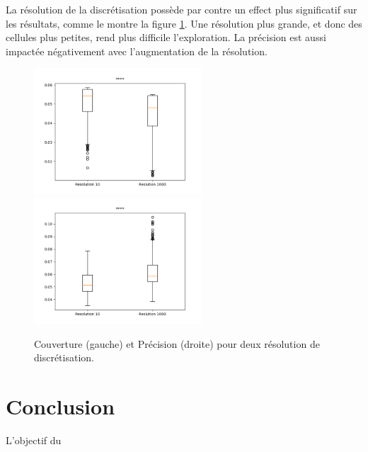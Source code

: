 \documentclass[11pt,french]{report}
\begin{document}
La résolution de la discrétisation possède par contre un effect plus significatif sur les résultats, comme le montre la figure \ref{fig:effet_res}.
Une résolution plus grande, et donc des cellules plus petites, rend plus difficile l'exploration. La précision est aussi impactée négativement avec l'augmentation de la résolution.

\begin{figure}[h]
    \centering
    \includegraphics[width=178pt]{Fro_10-1kres_couver.png} \includegraphics[width=178pt]{Fro_10-1kres_moy_gl.png}
    \caption{Couverture (gauche) et Précision (droite) pour deux résolution de discrétisation.}
    \label{fig:effet_res}
\end{figure}

\chapter{Conclusion}

L'objectif du 




\end{document}
